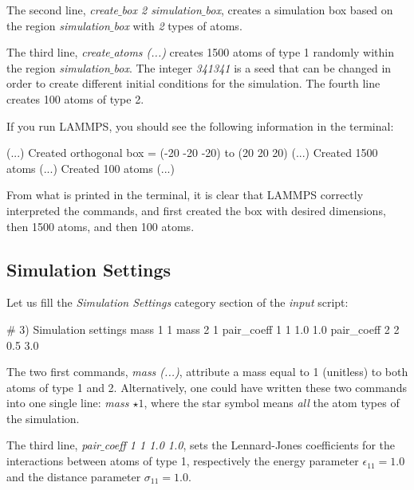 \vspace{0.25cm} \noindent The second line, \textit{create$\_$box 2 simulation$\_$box}, creates a simulation box based on
the region \textit{simulation$\_$box} with \textit{2} types of atoms.

\vspace{0.25cm} \noindent The third line, \textit{create$\_$atoms (...)} creates 1500 atoms of type 1
randomly within the region \textit{simulation$\_$box}. The integer \textit{341341} is a
seed that can be changed in order to create different
initial conditions for the simulation. The fourth line
creates 100 atoms of type 2.

\vspace{0.25cm} \noindent If you run LAMMPS, you should see the following information in the
terminal:

\begin{lcverbatim}
(...)
Created orthogonal box = (-20 -20 -20) to (20 20 20)
(...)
Created 1500 atoms
(...)
Created 100 atoms
(...)
\end{lcverbatim}

\noindent From what is printed in the terminal, it is clear that
LAMMPS correctly interpreted the commands, and first created
the box with desired dimensions, then 1500 atoms, and then 100
atoms.

\subsection{Simulation Settings}
\noindent Let us fill the \textit{Simulation Settings} category section of
the \textit{input} script:

\begin{lcverbatim}
# 3) Simulation settings
mass 1 1
mass 2 1
pair_coeff 1 1 1.0 1.0
pair_coeff 2 2 0.5 3.0
\end{lcverbatim}

\noindent The two first commands, \textit{mass (...)}, attribute a mass
equal to 1 (unitless) to both atoms of type 1 and 2.
Alternatively, one could have written
these two commands into one single line: \textit{mass $\star 1$},
where the star symbol means \textit{all} the atom types of the simulation. 

\vspace{0.25cm} \noindent The third line, \textit{pair$\_$coeff 1 1 1.0 1.0}, sets the Lennard-Jones
coefficients for the interactions between atoms of type 1,
respectively the energy parameter
$\epsilon_{11} = 1.0$ and the distance parameter $\sigma_{11} = 1.0$. 

